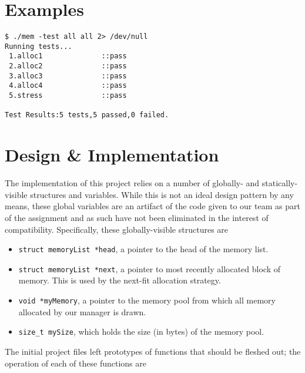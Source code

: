 \documentclass[paper=a4, fontsize=11pt]{scrartcl}
\begin{document}
\section*{Examples}
\begin{lstlisting}[style=ShellStyle]
$ ./mem -test all all 2> /dev/null
Running tests...
 1.alloc1              ::pass
 2.alloc2              ::pass
 3.alloc3              ::pass
 4.alloc4              ::pass
 5.stress              ::pass

Test Results:5 tests,5 passed,0 failed.
\end{lstlisting}

\section*{Design \& Implementation}
The implementation of this project relies on a number of globally- and statically-visible structures and variables. While this is not an ideal design pattern by any means, these global variables are an artifact of the code given to our team as part of the assignment and as such have not been eliminated in the interest of compatibility. Specifically, these globally-visible structures are

\begin{itemize}
  \item \texttt{struct memoryList *head}, a pointer to the head of the memory list.
  \item \texttt{struct memoryList *next}, a pointer to most recently allocated block of memory. This is used by the next-fit allocation strategy.
  \item \texttt{void *myMemory}, a pointer to the memory pool from which all memory allocated by our manager is drawn.
  \item \texttt{size\_t mySize}, which holds the size (in bytes) of the memory pool.
\end{itemize}

The initial project files left prototypes of functions that should be fleshed out; the operation of each of these functions are
\end{document}
